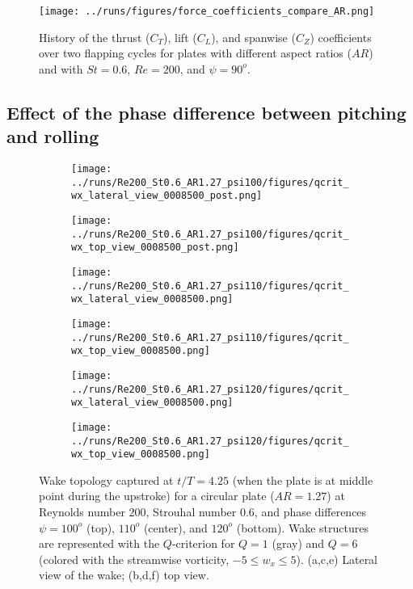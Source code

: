 \begin{figure}
  \centering
  \texttt{[image: ../runs/figures/force\_coefficients\_compare\_AR.png]}
  \caption{History of the thrust ($C_T$), lift ($C_L$), and spanwise ($C_Z$) coefficients over two flapping cycles for plates with different aspect ratios ($AR$) and with $St = 0.6$, $Re = 200$, and $\psi = 90^o$.}
  \label{fig:ratio_force_coefficients}
\end{figure}

\subsection{Effect of the phase difference between pitching and rolling}

\begin{figure}
  \centering
  \begin{subfigure}[]{0.45\textwidth}
    \centering
    \texttt{[image: ../runs/Re200\_St0.6\_AR1.27\_psi100/figures/qcrit\_wx\_lateral\_view\_0008500\_post.png]}
    \caption{}
  \end{subfigure}
  \hfill
  \begin{subfigure}[]{0.45\textwidth}
    \centering
    \texttt{[image: ../runs/Re200\_St0.6\_AR1.27\_psi100/figures/qcrit\_wx\_top\_view\_0008500\_post.png]}
    \caption{}
  \end{subfigure}
  \vspace{1cm}
  \begin{subfigure}[]{0.45\textwidth}
    \centering
    \texttt{[image: ../runs/Re200\_St0.6\_AR1.27\_psi110/figures/qcrit\_wx\_lateral\_view\_0008500.png]}
    \caption{}
  \end{subfigure}
  \hfill
  \begin{subfigure}[]{0.45\textwidth}
    \centering
    \texttt{[image: ../runs/Re200\_St0.6\_AR1.27\_psi110/figures/qcrit\_wx\_top\_view\_0008500.png]}
    \caption{}
  \end{subfigure}
  \vspace{1cm}
  \begin{subfigure}[]{0.45\textwidth}
    \centering
    \texttt{[image: ../runs/Re200\_St0.6\_AR1.27\_psi120/figures/qcrit\_wx\_lateral\_view\_0008500.png]}
    \caption{}
  \end{subfigure}
  \hfill
  \begin{subfigure}[]{0.45\textwidth}
    \centering
    \texttt{[image: ../runs/Re200\_St0.6\_AR1.27\_psi120/figures/qcrit\_wx\_top\_view\_0008500.png]}
    \caption{}
  \end{subfigure}
  \caption{Wake topology captured at $t / T = 4.25$ (when the plate is at middle point during the upstroke) for a circular plate ($AR = 1.27$) at Reynolds number $200$, Strouhal number $0.6$, and phase differences $\psi = 100^o$ (top), $110^o$ (center), and $120^o$ (bottom). Wake structures are represented with the $Q$-criterion for $Q = 1$ (gray) and $Q = 6$ (colored with the streamwise vorticity, $-5 \leq w_x \leq 5$). (a,c,e) Lateral view of the wake; (b,d,f) top view.}
  \label{fig:phase_wake_topology}
\end{figure}

